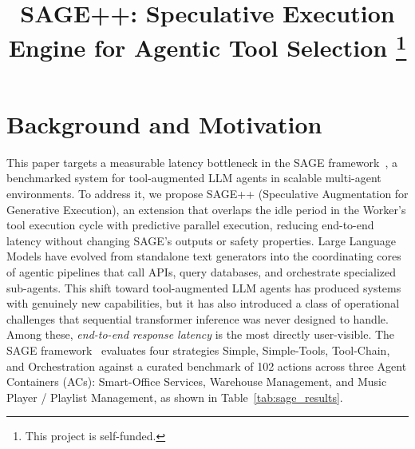 \documentclass[conference]{IEEEtran}
\begin{document}
\title{SAGE++: Speculative Execution Engine for Agentic Tool Selection%
\thanks{This project is self-funded.}}
\author{
\and
{}}
\maketitle

\section{Background and Motivation}
This paper targets a measurable latency bottleneck in the SAGE
framework~\cite{strehlow2026sage}, a benchmarked system for tool-augmented LLM
agents in scalable multi-agent environments.
To address it, we propose SAGE++ (Speculative Augmentation for Generative
Execution), an extension that overlaps the idle period in the Worker's tool
execution cycle with predictive parallel execution, reducing end-to-end latency
without changing SAGE's outputs or safety properties.
Large Language Models have evolved from standalone text generators into the
coordinating cores of agentic pipelines that call APIs, query databases, and
orchestrate specialized sub-agents.
This shift toward tool-augmented LLM agents has produced systems with genuinely
new capabilities, but it has also introduced a class of operational challenges
that sequential transformer inference was never designed to handle.
Among these, \emph{end-to-end response latency} is the most directly user-visible.
The SAGE framework~\cite{strehlow2026sage} evaluates four strategies Simple,
Simple-Tools, Tool-Chain, and Orchestration against a curated benchmark of
102 actions across three Agent Containers (ACs): Smart-Office Services,
Warehouse Management, and Music Player / Playlist Management,
as shown in Table~\ref{tab:sage_results}.

\begin{table}[!h]
\centering
\caption{SAGE benchmark results~\cite{strehlow2026sage}.
  Scores and times: \emph{simple\,/\,complex} queries.
  Orchestration is the bottleneck this project addresses.}
\label{tab:sage_results}
\renewcommand{\arraystretch}{1.3}
\end{table}
\end{document}
